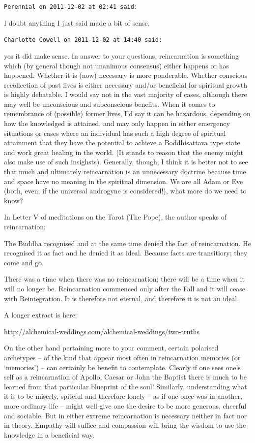 \begin{footnotesize}
\begin{sffamily}
\hfill

\texttt{Perennial on 2011-12-02 at 02:41 said:}

I doubt anything I just said made a bit of sense.

\hfill

\texttt{Charlotte Cowell on 2011-12-02 at 14:40 said:}

yes it did make sense. In answer to your questions, reincarnation is something which (by general though not unanimous consensus) either happens or has happened. Whether it is (now) necessary is more ponderable. Whether conscious recollection of past lives is either necessary and/or beneficial for spiritual growth is highly debatable. I would say not in the vast majority of cases, although there may well be unconscious and subconscious benefits. When it comes to remembrance of (possible) former lives, I'd say it can be hazardous, depending on how the knowledged is attained, and may only happen in either emergency situations or cases where an individual has such a high degree of spiritual attainment that they have the potential to achieve a Boddhisattava type state and work great healing in the world. (It stands to reason that the enemy might also make use of such insighsts). Generally, though, I think it is better not to see that much and ultimately reincarnation is an unnecessary doctrine because time and space have no meaning in the spiritual dimension. We are all Adam or Eve (both, even, if the universal androgyne is considered!), what more do we need to know?

In Letter V of meditations on the Tarot (The Pope), the author speaks of reincarnation:

The Buddha recognised and at the same time denied the fact of reincarnation. He recognised it as fact and he denied it as ideal. Because facts are transitiory; they come and go.

There was a time when there was no reincarnation; there will be a time when it will no longer be. Reincarnation commenced only after the Fall and it will cease with Reintegration. It is therefore not eternal, and therefore it is not an ideal.

A longer extract is here:

\url{http://alchemical-weddings.com/alchemical-weddings/two-truths}


On the other hand pertaining more to your comment, certain polarised archetypes -- of the kind that appear most often in reincarnation memories (or `memories') -- can certainly be benefit to contemplate. Clearly if one sees one's self as a reincarnation of Apollo, Caesar or John the Baptist there is much to be learned from that particular blueprint of the soul! Similarly, understanding what it is to be miserly, spiteful and therefore lonely -- as if one once was in another, more ordinary life -- might well give one the desire to be more generous, cheerful and sociable. But in either extreme reincarnation is necessary neither in fact nor in theory. Empathy will suffice and compassion will bring the wisdom to use the knowledge in a beneficial way.


\end{sffamily}
\end{footnotesize}
